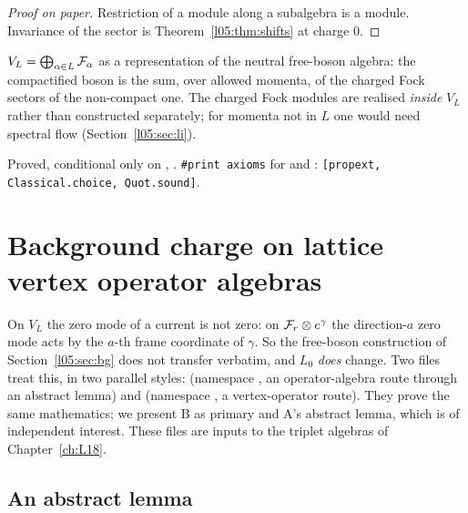 \begin{proof}[Proof on paper]
Restriction of a module along a subalgebra is a module. Invariance of the sector is Theorem~\ref{l05:thm:shifts} at
charge $0$.
\end{proof}

\begin{physics}
$V_L=\bigoplus_{\alpha\in L}\mathcal{F}_\alpha$ as a representation of the neutral free-boson algebra: the compactified boson
is the sum, over allowed momenta, of the charged Fock sectors of the non-compact one. The charged Fock modules are
realised \emph{inside} $V_L$ rather than constructed separately; for momenta not in $L$ one would need spectral flow
(Section~\ref{l05:sec:li}).
\end{physics}

\begin{status}
Proved, conditional only on , . \texttt{\#print axioms} for
 and :
\texttt{[propext, Classical.choice, Quot.sound]}.
\end{status}

\section{Background charge on lattice vertex operator algebras}\label{l05:sec:latbg}

On $V_L$ the zero mode of a current is not zero: on $\mathcal{F}_r\otimes e^\gamma$ the direction-$a$ zero mode acts by the
$a$-th frame coordinate of $\gamma$. So the free-boson construction of Section~\ref{l05:sec:bg} does not transfer
verbatim, and $L_0$ \emph{does} change. Two files treat this, in two parallel styles:
 (namespace , an operator-algebra route through an abstract
lemma) and  (namespace , a vertex-operator route). They
prove the same mathematics; we present B as primary and A's abstract lemma, which is of independent interest. These files
are inputs to the triplet algebras of Chapter~\ref{ch:L18}.

\subsection{An abstract lemma}

